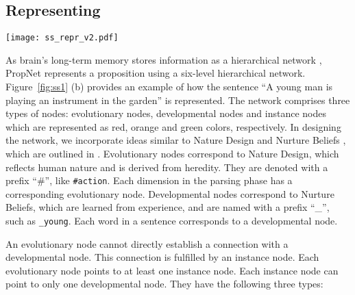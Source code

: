  
\subsection{Representing}
\label{method:represent}


\begin{figure*}[h!]
  \texttt{[image: ss\_repr\_v2.pdf]}
  \center
  \caption{(a) Six-level hierarchical structure of PropNet. (b) An example of representing the sentence ``A young man is playing an instrument in the garden''. Evolutionary nodes, developmental nodes, instance nodes and stamp nodes are labeled as red, orange, green and grey colors respectively.}
  \label{fig:ss1}
\end{figure*}

As brain's long-term memory stores information as a hierarchical network \citep{Collins1969RetrievalTF, Anderson1974RetrievalOP, Kintsch1974TheRO}, PropNet represents a proposition using a six-level hierarchical network. Figure~\ref{fig:ss1} (b) provides an example of how the sentence ``A young man is playing an instrument in the garden'' is represented. The network comprises three types of nodes: evolutionary nodes, developmental nodes and instance nodes which are represented as red, orange and green colors, respectively. In designing the network, we incorporate ideas similar to Nature Design and Nurture Beliefs , which are outlined in \citep{Yang2024AutomaticEO}. Evolutionary nodes correspond to Nature Design, which reflects human nature and is derived from heredity. They are denoted with a prefix ``\#'', like \texttt{\#action}. Each dimension in the parsing phase has a corresponding evolutionary node. Developmental nodes correspond to Nurture Beliefs, which are learned from experience, and are named with a prefix ``\_'', such as \texttt{\_young}. Each word in a sentence corresponds to a developmental node. 

An evolutionary node cannot directly establish a connection with a developmental node. This connection is fulfilled by an instance node. Each evolutionary node points to at least one instance node. Each instance node can point to only one developmental node. They have the following three types:

